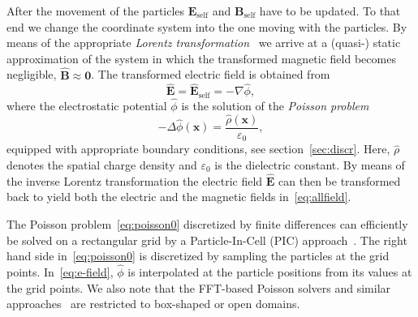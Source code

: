 \documentclass[a4paper,10pt,3p,preprint,pdftex]{elsarticle}
\newcommand {\RM}[1]{\mathrm{#1}}
\begin{document}
After the movement of the particles 
$\mathbf{E_{\RM{self}}}$ and $\mathbf{B_{\RM{self}}}$ have to be updated.  
To that end we change the coordinate system into the one moving with the
particles.  By means of the appropriate \emph{Lorentz
  transformation}~\cite{lali:84} we arrive at a (quasi-) static
approximation of the system in which the transformed magnetic field
becomes negligible, $\hat{\mathbf{B}}\! \approx\! \mathbf{0}$.  The
transformed electric field is obtained from
\begin{equation}\label{eq:e-field}
  \hat{\mathbf{E}}=\hat{\mathbf{E}}_{\RM{self}}=-\nabla\hat{\phi},
\end{equation}
where the electrostatic potential $\hat{\phi}$ is the solution of the
\emph{Poisson problem}
\begin{equation}\label{eq:poisson0}
  - \Delta \hat{\phi}(\mathbf{x}) =
  \frac{\hat{\rho}(\mathbf{x})}{\varepsilon_0},
\end{equation}
equipped with appropriate boundary conditions, see
section~\ref{sec:discr}.  Here, $\hat{\rho}$ denotes the spatial charge
density and $\varepsilon_0$ is the dielectric constant.
By means of the inverse Lorentz transformation the electric field
$\hat{\mathbf{E}}$ can then be transformed back to yield both the
electric and the magnetic fields in~\eqref{eq:allfield}.

The Poisson problem~\eqref{eq:poisson0} discretized by finite
differences can efficiently be solved on a rectangular grid by a
Particle-In-Cell (PIC) approach~\cite{qiry:01}.  The right hand side
in~\eqref{eq:poisson0} is discretized by sampling the particles at the
grid points.  In~\eqref{eq:e-field}, $\hat{\phi}$ is interpolated at the
particle positions from its values at the grid points. We also note that
the FFT-based Poisson solvers and similar
approaches~\cite{qiry:01,qigl:04} are restricted to box-shaped or open domains.
\end{document}
